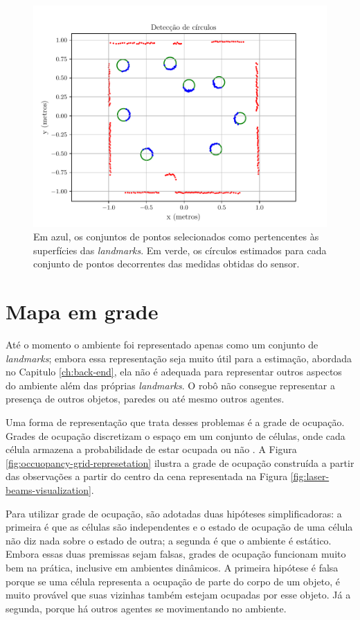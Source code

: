 \begin{figure}[]
  \centering
  \includegraphics[width=.8\textwidth]{figs/circle_detection.pdf}
  \caption[Círculos ajustados aos conjuntos de pontos oriundos de reflexões nas superfícies dos \textit{landmarks}]{Em azul, os conjuntos de pontos selecionados como pertencentes às superfícies das \textit{landmarks}. Em verde, os círculos 
  estimados para cada conjunto de pontos decorrentes das medidas obtidas do sensor.}
  \label{fig:detected-circles}
\end{figure}

\section{Mapa em grade}
Até o momento o ambiente foi representado apenas como um conjunto de 
\textit{landmarks}; embora essa representação seja muito útil para a 
estimação, abordada no Capitulo \ref{ch:back-end}, ela não é adequada 
para representar outros aspectos do ambiente além das próprias \textit{landmarks}. O robô não consegue representar a presença de outros 
objetos, paredes ou até mesmo outros agentes.

Uma forma de representação que trata desses problemas é a grade de 
ocupação. Grades de ocupação discretizam o espaço em um conjunto de 
células, onde cada célula armazena a probabilidade de estar ocupada ou 
não \cite{elfes1989using}. A Figura \ref{fig:occuopancy-grid-represetation} ilustra a grade de ocupação construída a 
partir das observações a partir do centro da cena representada na Figura 
\ref{fig:laser-beams-visualization}.

Para utilizar grade de ocupação, são adotadas duas hipóteses 
simplificadoras: a primeira é que as células são independentes e o 
estado de ocupação de uma célula não diz nada sobre o estado de outra; a 
segunda é que o ambiente é estático. Embora essas duas premissas sejam 
falsas, grades de ocupação funcionam muito bem na prática, inclusive em 
ambientes dinâmicos. A primeira hipótese é falsa porque se uma célula 
representa a ocupação de parte do corpo de um objeto, é muito provável 
que suas vizinhas também estejam ocupadas por esse objeto. Já a segunda, 
porque há outros agentes se movimentando no ambiente.


